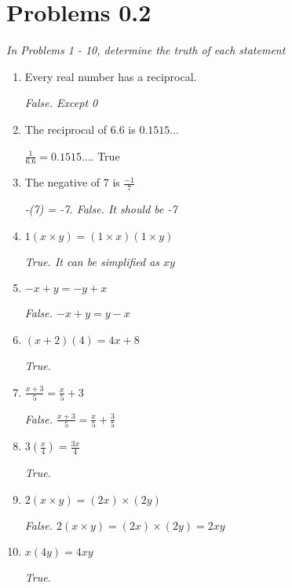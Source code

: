 \documentclass{article}
\begin{document}
\break

\section{Problems 0.2}\par
\textit{In Problems 1 - 10, determine the truth of each statement}

\begin{enumerate}
    \item Every real number has a reciprocal. \par
    \textit{False. Except 0}

    \item The reciprocal of $6.6$ is $0.1515\dots$ \par
    \textit{$\frac{1}{6.6} = 0.1515\dots$}. True

    \item The negative of 7 is $\frac{-1}{7}$ \par
    \textit{-(7) = -7. False. It should be -7}

    \item $1(x \times y) = (1 \times x)(1 \times y)$ \par
    \textit{True. It can be simplified as $xy$}

    \item $-x + y = -y + x$\par
    \textit{False. $-x + y = y - x$}

    \item $(x + 2)(4) = 4x + 8$\par
    \textit{True.}

    \item $\frac{x + 3}{5} = \frac{x}{5} + 3$\par
    \textit{False. $\frac{x + 3}{5} = \frac{x}{5} + \frac{3}{5}$}

    \item $3 \left( \frac{x}{4} \right) = \frac{3x}{4}$\par
    \textit{True.}

    \item $2(x \times y) = (2x) \times (2y)$\par
    \textit{False. $2(x \times y) = (2x) \times (2y) = 2xy$}

    \item $x(4y) = 4xy$\par
    \textit{True.}
\end{enumerate}
\end{document}
